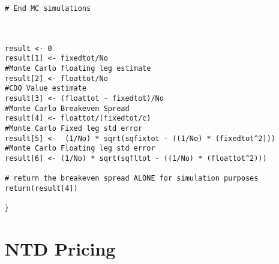 \begin{singlespace}
\begin{lstlisting}
# End MC simulations



result <- 0
result[1] <- fixedtot/No    
#Monte Carlo floating leg estimate  
result[2] <- floattot/No    
#CDO Value estimate   
result[3] <- (floattot - fixedtot)/No    
#Monte Carlo Breakeven Spread 
result[4] <- floattot/(fixedtot/c)    
#Monte Carlo Fixed leg std error
result[5] <-  (1/No) * sqrt(sqfixtot - ((1/No) * (fixedtot^2)))    
#Monte Carlo Floating leg std error 
result[6] <- (1/No) * sqrt(sqfltot - ((1/No) * (floattot^2)))     

# return the breakeven spread ALONE for simulation purposes
return(result[4])

}

\end{lstlisting}
\end{singlespace}

\section{NTD Pricing}

